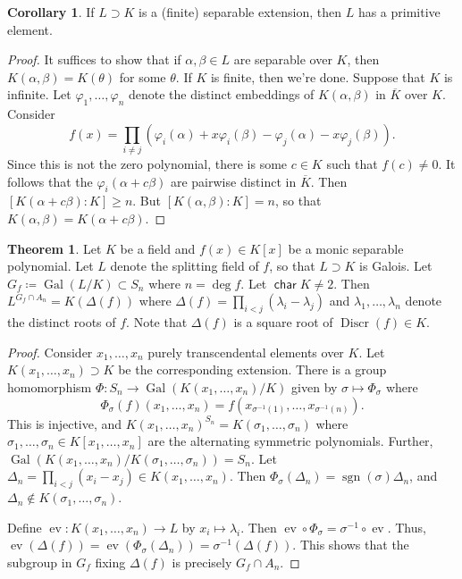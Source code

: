 \documentclass[10pt,letterpaper,cm]{nupset}
\theoremstyle{definition}
\theoremstyle{theorem}
\newtheorem{theorem}[definition]{Theorem}
\newtheorem{corollary}[definition]{Corollary}
\theoremstyle{remark}
\newcommand{\1}{\mathbf{1}}
\newcommand{\0}{\vec 0}
\DeclareMathOperator{\Char}{\mathsf{char}}
\DeclareMathOperator{\gal}{Gal}
\DeclareMathOperator{\ev}{ev}
\DeclareMathOperator{\sgn}{sgn}
\DeclareMathOperator{\disc}{Discr}
\begin{document}
\begin{corollary}
If $L \supset K$ is a (finite) separable extension, then $L$ has a primitive element. 
\end{corollary}
\begin{proof}
It suffices to show that if $\alpha, \beta \in L$ are separable over $K$, then $K(\alpha, \beta) = K(\theta)$ for some $\theta$. If $K$ is finite, then we're done. Suppose that $K$ is infinite. Let $\varphi_1, \ldots, \varphi_n$ denote the distinct embeddings of $K(\alpha, \beta)$ in $\overline{K}$ over $K$. Consider $$ f(x) = \prod_{i \ne j} (\varphi_i(\alpha) + x \varphi_i(\beta) - \varphi_j(\alpha) - x \varphi_j(\beta))   .$$ Since this is not the zero polynomial, there is some $c\in K$ such that $f(c) \ne 0$. It follows that the $\varphi_i(\alpha + c \beta)$ are pairwise distinct in $\overline{K}$. Then $[K(\alpha + c \beta) : K] \geq n$. But $[K(\alpha, \beta) : K] = n$, so that $K(\alpha, \beta) = K(\alpha + c \beta)$. 
\end{proof}

\begin{theorem}
 Let $K$ be a field and $f(x) \in K[x]$ be a monic separable polynomial. Let $L$ denote the splitting field of $f$, so that $L \supset K$ is Galois. Let $G_f \coloneqq  \gal(L/K) \subset S_n$ where $n = \deg{f}$. Let $\Char{K} \ne 2$. Then $L^{G_f \cap A_n} = K(\Delta(f))$ where $\Delta(f) = \prod_{i < j}(\lambda_i - \lambda_j)$ and $\lambda_1, \ldots, \lambda_n$ denote the distinct roots of $f$. Note that $\Delta(f)$ is a square root of $\disc(f) \in K$. 
\end{theorem}
\begin{proof}
Consider $x_1, \ldots, x_n$ purely transcendental elements over $K$. Let $K(x_1, \ldots, x_n) \supset K$ be the corresponding extension. There is a group homomorphism $\Phi : S_n \to \gal(K(x_1, \ldots, x_n)/K)$ given by $\sigma \mapsto \Phi_{\sigma}$ where $$\Phi_{\sigma}(f)(x_1, \ldots, x_n) = f(x_{\sigma^{-1}(1)}, \ldots, x_{\sigma^{-1}(n)}).$$ This is injective, and $K(x_1, \ldots, x_n)^{S_n} = K(\sigma_1, \ldots, \sigma_n)$ where $\sigma_1, \ldots, \sigma_n \in K[x_1, \ldots, x_n]$ are the alternating symmetric polynomials. Further, $\gal(K(x_1, \ldots, x_n)/K(\sigma_1, \ldots, \sigma_n)) = S_n$. Let $\Delta_n = \prod_{i <j}(x_i - x_j) \in K(x_1, \ldots, x_n)$. Then $\Phi_{\sigma}(\Delta_n) = \sgn(\sigma)\Delta_n$, and $\Delta_n \notin K(\sigma_1, \ldots, \sigma_n)$. 

\medskip

 Define $\ev : K(x_1, \ldots, x_n) \to L$ by $x_i \mapsto \lambda_i$. Then $\ev \circ \Phi_{\sigma} = \sigma^{-1} \circ \ev$. Thus, $\ev(\Delta(f)) = \ev(\Phi_{\sigma}(\Delta_n)) = \sigma^{-1}(\Delta(f))$. This shows that the subgroup in $G_f$ fixing $\Delta(f)$ is precisely $G_f \cap A_n$. 
\end{proof}
\end{document}
